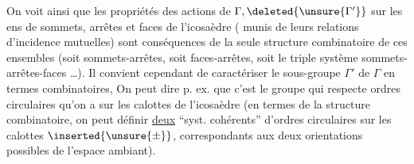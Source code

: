 On voit ainsi que les propriétés des actions de $\Gamma,\deleted{\unsure{\Gamma'}}$ sur les ens de sommets, arrêtes et faces de l'icosaèdre ( munis de leurs relations d'incidence mutuelles) sont conséquences de la seule structure combinatoire de ces ensembles (soit  sommets-arrêtes, soit faces-arrêtes, soit  le triple système sommets-arrêtes-faces \ldots). Il convient cependant de caractériser le sous-groupe $\Gamma'$ de $\Gamma$ en termes combinatoires, On peut dire p. ex. que c'est le groupe qui respecte  ordres circulaires qu'on a sur les  calottes  de  l'icosaèdre (en termes de la structure combinatoire, on peut définir \uline{deux} ``syst. cohérents'' d'ordres circulaires sur les calottes  $\inserted{\unsure{\pm}}$, correspondants aux deux orientations possibles de l'espace ambiant).

